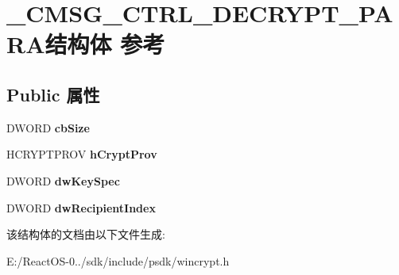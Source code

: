 \hypertarget{struct___c_m_s_g___c_t_r_l___d_e_c_r_y_p_t___p_a_r_a}{}\section{\+\_\+\+C\+M\+S\+G\+\_\+\+C\+T\+R\+L\+\_\+\+D\+E\+C\+R\+Y\+P\+T\+\_\+\+P\+A\+R\+A结构体 参考}
\label{struct___c_m_s_g___c_t_r_l___d_e_c_r_y_p_t___p_a_r_a}
\subsection*{Public 属性}
\begin{DoxyCompactItemize}
\item 
\mbox{\label{struct___c_m_s_g___c_t_r_l___d_e_c_r_y_p_t___p_a_r_a_a5998a8fb97aaa10c246f322f17296788}} 
D\+W\+O\+RD {\bfseries cb\+Size}
\item 
\mbox{\label{struct___c_m_s_g___c_t_r_l___d_e_c_r_y_p_t___p_a_r_a_a0adad48c2f3ae57bfdf578e001c350c5}} 
H\+C\+R\+Y\+P\+T\+P\+R\+OV {\bfseries h\+Crypt\+Prov}
\item 
\mbox{\label{struct___c_m_s_g___c_t_r_l___d_e_c_r_y_p_t___p_a_r_a_a96980d540e68b0fb9d19d929e39be2f4}} 
D\+W\+O\+RD {\bfseries dw\+Key\+Spec}
\item 
\mbox{\label{struct___c_m_s_g___c_t_r_l___d_e_c_r_y_p_t___p_a_r_a_a65ad6fd8951d5b835e9b3f1939a90f65}} 
D\+W\+O\+RD {\bfseries dw\+Recipient\+Index}
\end{DoxyCompactItemize}


该结构体的文档由以下文件生成\+:\begin{DoxyCompactItemize}
\item 
E\+:/\+React\+O\+S-\/0../sdk/include/psdk/wincrypt.\+h\end{DoxyCompactItemize}
